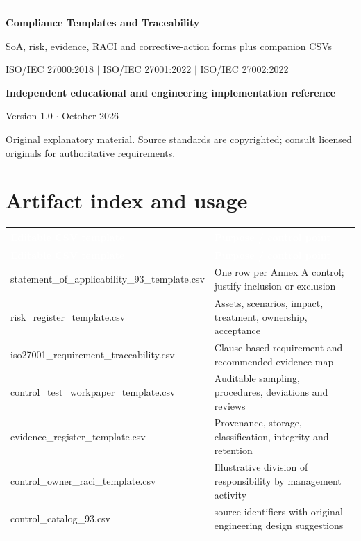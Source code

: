 \documentclass[11pt,letterpaper]{article}
\begin{document}
\begin{titlepage}
\vspace*{1.2in}
{\color{teal}\rule{\textwidth}{4pt}}\par\vspace{20pt}
{\Huge\bfseries\color{navy} Compliance Templates and Traceability}\par\vspace{18pt}
{\Large\color{graytext} SoA, risk, evidence, RACI and corrective-action forms plus companion CSVs}\par\vspace{1.3in}
{\large ISO/IEC 27000:2018 $\vert$ ISO/IEC 27001:2022 $\vert$ ISO/IEC 27002:2022}\par
\vfill
\textbf{Independent educational and engineering implementation reference}\par
Version 1.0 $\cdot$ October 2026\par
{\small Original explanatory material. Source standards are copyrighted; consult licensed originals for authoritative requirements.}\par
\end{titlepage}
\tableofcontents\clearpage{}
\section{Artifact index and usage}
\small{}\begin{longtable}{>{\raggedright\arraybackslash}p{}>{\raggedright\arraybackslash}p{}}
\rowcolor{navy} \textcolor{white}{\textbf{Editable CSV template}} & \textcolor{white}{\textbf{Purpose / control point}}\\
\endfirsthead
\rowcolor{navy} \textcolor{white}{\textbf{Editable CSV template}} & \textcolor{white}{\textbf{Purpose / control point}}\\
\endhead
statement\_of\_applicability\_93\_template.csv & One row per Annex A control; justify inclusion or exclusion\\
risk\_register\_template.csv & Assets, scenarios, impact, treatment, ownership, acceptance\\
iso27001\_requirement\_traceability.csv & Clause-based requirement and recommended evidence map\\
control\_test\_workpaper\_template.csv & Auditable sampling, procedures, deviations and reviews\\
evidence\_register\_template.csv & Provenance, storage, classification, integrity and retention\\
control\_owner\_raci\_template.csv & Illustrative division of responsibility by management activity\\
control\_catalog\_93.csv & 93 source identifiers with original engineering design suggestions\\
\end{longtable}\normalsize
\end{document}
